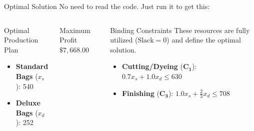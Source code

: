 \documentclass{beamer}
\begin{document}
\begin{frame}{Optimal Solution}
No need to read the code. Just run it to get this:
    \begin{columns}
        \centering
        \begin{block}{Optimal Production Plan}
            \vspace{0.2cm}
            \begin{itemize}
                \item \textbf{Standard Bags} (\(x_s\)): 540
                \item \textbf{Deluxe Bags} (\(x_d\)): 252
            \end{itemize}
            \vspace{0.2cm}
        \end{block}

        \begin{alertblock}{Maximum Profit}
            \centering
            \textbf{\Large \(\$7,668.00\)}
        \end{alertblock}
        
        \centering
        \begin{alertblock}{Binding Constraints}
            \vspace{0.2cm}
            These resources are fully utilized (\(\text{Slack} = 0\)) and define the optimal solution.
            \vspace{0.1cm}
            \begin{itemize}
                \item \textbf{Cutting/Dyeing} (\(\mathbf{C_1}\)): \(0.7 x_s + 1.0 x_d \le 630\)
                \item \textbf{Finishing} (\(\mathbf{C_3}\)): \(1.0 x_s + \frac{2}{3} x_d \le 708\)
            \end{itemize}
            \vspace{0.2cm}
        \end{alertblock}
    \end{columns}

\end{frame}
\end{document}
